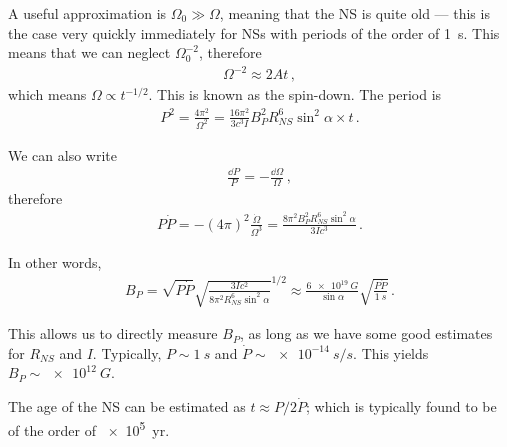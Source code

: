 \documentclass[main.tex]{subfiles}
\begin{document}
A useful approximation is \(\Omega_0 \gg \Omega \), meaning that the NS is quite old --- this is the case very quickly immediately for NSs with periods of the order of \SI{1}{s}. 
This means that we can neglect \(\Omega_0^{-2}\), therefore 
%
\begin{align}
\Omega^{-2} \approx 2 A t
\,,
\end{align}
%
which means \(\Omega \propto t^{-1/2}\). 
This is known as the spin-down. 
The period is 
%
\begin{align}
P^2 = \frac{4 \pi^2}{\Omega^2}
= \frac{16 \pi^2}{3 c^3 I} B_P^2 R_{NS}^{6} \sin^2 \alpha  \times t
\,.
\end{align}

We can also write 
%
\begin{align}
\frac{ \dd{P}}{P} = - \frac{\dd{\Omega}}{\Omega }
\,,
\end{align}
%
therefore 
%
\begin{align}
P \dot{P} = -(4 \pi)^2 \frac{\dot{\Omega}}{\Omega^3}
= \frac{8 \pi^2 B_P^2 R_{NS}^{6} \sin^2\alpha }{3 I c^3} 
\,.
\end{align}

In other words, 
%
\begin{align}
B_P = \sqrt{P \dot{P}} \sqrt{\frac{3 I c^2}{8 \pi^2 R_{NS}^{6} \sin^2 \alpha }}^{1/2}
\approx \frac{\SI{6e19}{G}}{\sin \alpha } \sqrt{ \frac{P\dot{P}}{\SI{1}{s}} }
\,.
\end{align}

This allows us to directly measure \(B_P\), as long as we have some good estimates for \(R_{NS}\) and \(I\). Typically, \(P \sim \SI{1}{s}\) and \(\dot{P} \sim \SI{e-14}{s/s}\). 
This yields \(B_P \sim \SI{e12}{G}\). 

The age of the NS can be estimated as \(t \approx P / 2 \dot{P}\); which is typically found to be of the order of \SI{e5}{yr}.
\end{document}
